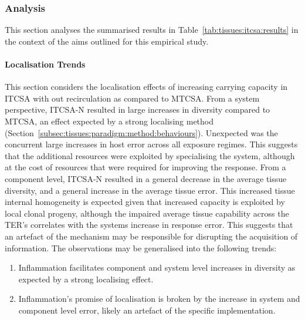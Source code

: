 %
%
\subsubsection{Analysis}
This section analyses the summarised results in Table~\ref{tab:tissues:itcsa:results} in the context of the aims outlined for this empirical study.

%
%
\paragraph{Localisation Trends}
This section considers the localisation effects of increasing carrying capacity in ITCSA with out recirculation as compared to MTCSA. 
From a system perspective, ITCSA-N resulted in large increases in diversity compared to MTCSA, an effect expected by a strong localising method (Section~\ref{subsec:tissues:paradigm:method:behaviours}). Unexpected was the concurrent large increases in host error across all exposure regimes. This suggests that the additional resources were exploited by specialising the system, although at the cost of resources that were required for improving the response.
From a component level, ITCSA-N resulted in a general decrease in the average tissue diversity, and a general increase in the average tissue error. This increased tissue internal homogeneity is expected given that increased capacity is exploited by local clonal progeny, although the impaired average tissue capability across the TER's correlates with the systems increase in response error. This suggests that an artefact of the mechanism may be responsible for disrupting the acquisition of information. 
The observations may be generalised into the following trends:

\begin{enumerate}
	\item Inflammation facilitates component and system level increases in diversity as expected by a strong localising effect.
	\item Inflammation's promise of localisation is broken by the increase in system and component level error, likely an artefact of the specific implementation.
\end{enumerate}

%
%
